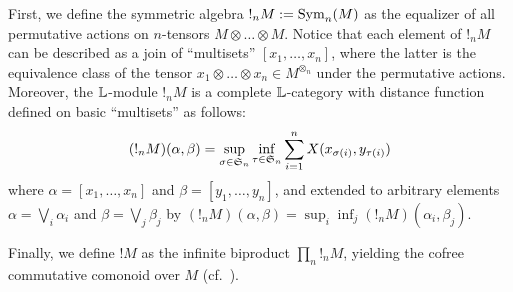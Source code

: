 First, we define the symmetric algebra $!_{n}M:=\mathrm{Sym}_{n}(M)$ as the equalizer of all permutative actions on $n$-tensors $M\otimes \dots \otimes M$.
Notice that each element of $!_{n}M$ can be described as a join of ``multisets''
$[x_{1},\dots, x_{n}]$, where the latter is the equivalence class of the tensor
$x_{1}\otimes \dots \otimes x_{n}\in M^{\otimes_{n}}$ under the permutative actions.
Moreover, the $\mathbb{L}$-module $!_{n}M$ is a complete $\mathbb{L}$-category with distance function defined on basic ``multisets'' as follows:
\begin{align}
(!_{n}M)(\alpha,\beta)=
\sup_{\sigma\in \mathfrak{S}_{n}}\inf_{\tau\in \mathfrak{S}_{n}}\sum_{i=1}^{n}
X(x_{\sigma(i)},y_{\tau(i)})
\end{align}
where $\alpha=[x_{1},\dots, x_{n}]$ and $\beta= [y_{1},\dots, y_{n}]$, and extended to arbitrary elements $\alpha=\bigvee_{i}\alpha_{i}$ and $\beta=\bigvee_{j}\beta_{j}$
by $(!_{n}M)(\alpha,\beta)=\sup_{i}\inf_{j}(!_{n}M)(\alpha_{i},\beta_{j})$. 


 
Finally, we define $!M$ as the infinite biproduct $\prod_{n}!_{n}M$, yielding the cofree commutative comonoid over $M$ (cf.~\cite[Proposition 1]{Mellies2018}).


